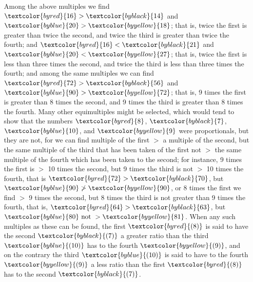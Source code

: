 \documentclass[booklanguage=english]{byrnebook}
\begin{document}
Among the above multiples we find $\textcolor{byred}{16} > \textcolor{byblack}{14}$ and $\textcolor{byblue}{20} > \textcolor{byyellow}{18}$; that is, twice the first is greater than twice the second, and twice the third is greater than twice the fourth; and $\textcolor{byred}{16} < \textcolor{byblack}{21}$ and $\textcolor{byblue}{20} < \textcolor{byyellow}{27}$; that is, twice the first is less than three times the second, and twice the third is less than three times the fourth; and among the same multiples we can find $\textcolor{byred}{72} > \textcolor{byblack}{56}$ and $\textcolor{byblue}{90} > \textcolor{byyellow}{72}$; that is, 9 times the first is greater than 8 times the second, and 9 times the third is greater than 8 times the fourth. Many other equimultiples might be selected, which would tend to show that the numbers $\textcolor{byred}{8}$, $\textcolor{byblack}{7}$, $\textcolor{byblue}{10}$, and $\textcolor{byyellow}{9}$ were proportionals, but they are not, for we can find multiple of the first $>$ a multiple of the second, but the same multiple of the third that has been taken of the first not $>$ the same multiple of the fourth which has been taken to the second; for instance, 9 times the first is $>$ 10 times the second, but 9 times the third is not $>$ 10 times the fourth, that is $\textcolor{byred}{72} > \textcolor{byblack}{70}$, but $\textcolor{byblue}{90} \ngtr \textcolor{byyellow}{90}$, or 8 times the first we find $>$ 9 times the second, but 8 times the third is not greater than 9 times the fourth, that is, $\textcolor{byred}{64} > \textcolor{byblack}{63}$, but $\textcolor{byblue}{80} \mbox{ not } > \textcolor{byyellow}{81}$. When any such multiples as these can be found, the first $\textcolor{byred}{(8)}$ is said to have the second $\textcolor{byblack}{(7)}$ a greater ratio than the third $\textcolor{byblue}{(10)}$ has to the fourth $\textcolor{byyellow}{(9)}$, and on the contrary the third $\textcolor{byblue}{(10)}$ is said to have to the fourth $\textcolor{byyellow}{(9)}$ a less ratio than the first $\textcolor{byred}{(8)}$ has to the second $\textcolor{byblack}{(7)}$.

\vfill\pagebreak

\end{document}
